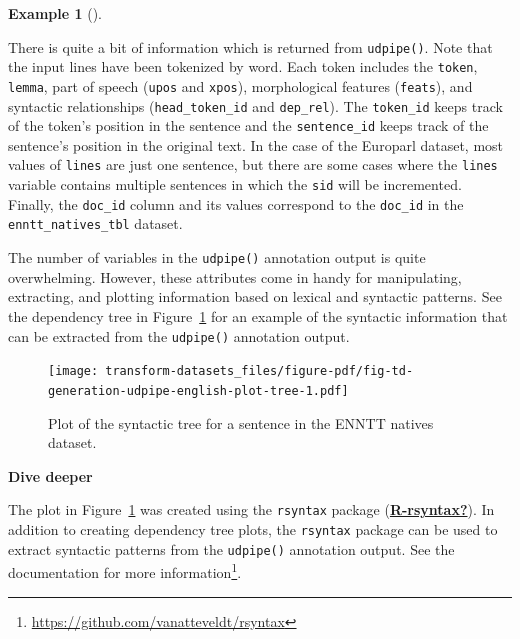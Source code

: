 \documentclass[
  letterpaper,
  DIV=11,
  numbers=noendperiod]{scrreport}
\theoremstyle{definition}
\newtheorem{example}{Example}[chapter]
\theoremstyle{remark}
\DeclareRobustCommand{\href}[2]{#2\footnote{\url{#1}}}
\begin{document}
\begin{example}[]
\end{example}

There is quite a bit of information which is returned from
\texttt{udpipe()}. Note that the input lines have been tokenized by
word. Each token includes the \texttt{token}, \texttt{lemma}, part of
speech (\texttt{upos} and \texttt{xpos}), morphological features
(\texttt{feats}), and syntactic relationships (\texttt{head\_token\_id}
and \texttt{dep\_rel}). The \texttt{token\_id} keeps track of the
token's position in the sentence and the \texttt{sentence\_id} keeps
track of the sentence's position in the original text. In the case of
the Europarl dataset, most values of \texttt{lines} are just one
sentence, but there are some cases where the \texttt{lines} variable
contains multiple sentences in which the \texttt{sid} will be
incremented. Finally, the \texttt{doc\_id} column and its values
correspond to the \texttt{doc\_id} in the \texttt{enntt\_natives\_tbl}
dataset.

The number of variables in the \texttt{udpipe()} annotation output is
quite overwhelming. However, these attributes come in handy for
manipulating, extracting, and plotting information based on lexical and
syntactic patterns. See the dependency tree in
Figure~\ref{fig-td-generation-udpipe-english-plot-tree} for an example
of the syntactic information that can be extracted from the
\texttt{udpipe()} annotation output.

\begin{figure}[H]

{\centering \texttt{[image: transform-datasets\_files/figure-pdf/fig-td-generation-udpipe-english-plot-tree-1.pdf]}

}

\caption{\label{fig-td-generation-udpipe-english-plot-tree}Plot of the
syntactic tree for a sentence in the ENNTT natives dataset.}

\end{figure}

\begin{tcolorbox}[enhanced jigsaw, breakable, colback=white, rightrule=.15mm, arc=.35mm, left=2mm, toprule=.15mm, leftrule=.75mm, bottomrule=.15mm, opacityback=0]

\textbf{ Dive deeper}

The plot in Figure~\ref{fig-td-generation-udpipe-english-plot-tree} was
created using the \texttt{rsyntax} package
(\protect\hyperlink{ref-R-rsyntax}{\textbf{R-rsyntax?}}). In addition to
creating dependency tree plots, the \texttt{rsyntax} package can be used
to extract syntactic patterns from the \texttt{udpipe()} annotation
output. \href{https://github.com/vanatteveldt/rsyntax}{See the
documentation for more information}.

\end{tcolorbox}
\end{document}
